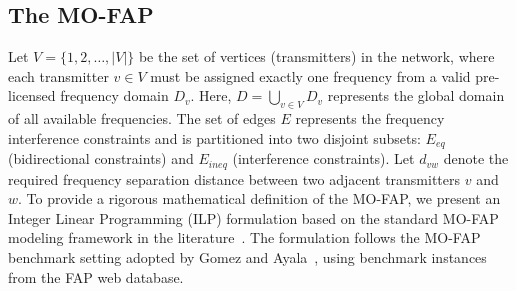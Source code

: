 \documentclass[letterpaper,journal]{IEEEtran}
\begin{document}
\subsection{The MO-FAP}
Let $V=\{1, 2, \dots, |V|\}$ be the set of vertices (transmitters) in the network, where each transmitter $v \in V$ must be assigned exactly one frequency from a valid pre-licensed frequency domain $D_v$. 
Here, $D = \bigcup_{v \in V} D_v$ represents the global domain of all available frequencies. 
The set of edges $E$ represents the frequency interference constraints and is partitioned into two disjoint subsets: $E_{eq}$ (bidirectional constraints) and $E_{ineq}$ (interference constraints). 
Let $d_{vw}$ denote the required frequency separation distance between two adjacent transmitters $v$ and $w$.
To provide a rigorous mathematical definition of the MO-FAP, we present an Integer Linear Programming (ILP) formulation based on the standard MO-FAP modeling framework in the literature~\cite{Aardal2007}.
The formulation follows the MO-FAP benchmark setting adopted by Gomez and Ayala~\cite{Gomez2023MO}, using benchmark instances from the FAP web database.
\end{document}
